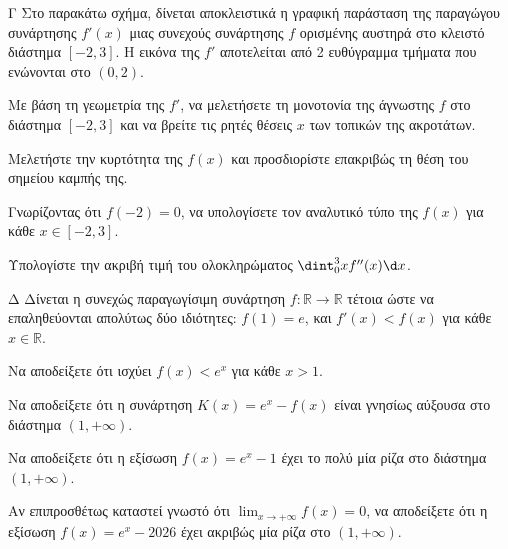 \begin{thema}{Γ}
Στο παρακάτω σχήμα, δίνεται αποκλειστικά η γραφική παράσταση της παραγώγου συνάρτησης $f'(x)$ μιας συνεχούς συνάρτησης $f$ ορισμένης αυστηρά στο κλειστό διάστημα $[-2, 3]$. Η εικόνα της $f'$ αποτελείται από 2 ευθύγραμμα τμήματα που ενώνονται στο $(0,2)$.

\begin{center}
\end{center}

\begin{erwthma}
    \item Με βάση τη γεωμετρία της $f'$, να μελετήσετε τη μονοτονία της άγνωστης $f$ στο διάστημα $[-2, 3]$ και να βρείτε τις ρητές θέσεις $x$ των τοπικών της ακροτάτων. 
    \item Μελετήστε την κυρτότητα της $f(x)$ και προσδιορίστε επακριβώς τη θέση του σημείου καμπής της. 
    \item Γνωρίζοντας ότι $f(-2) = 0$, να υπολογίσετε τον αναλυτικό τύπο της $f(x)$ για κάθε $x \in [-2, 3]$. 
    \item Υπολογίστε την ακριβή τιμή του ολοκληρώματος $\dint_0^3 x f''(x) \d x$. 
\end{erwthma}
\end{thema}

\begin{thema}{Δ}
Δίνεται η συνεχώς παραγωγίσιμη συνάρτηση $f: \mathbb{R} \to \mathbb{R}$ τέτοια ώστε να επαληθεύονται απολύτως δύο ιδιότητες: $f(1)=e$, και $f'(x) < f(x)$ για κάθε $x \in \mathbb{R}$.
\begin{erwthma}
    \item Να αποδείξετε ότι ισχύει $f(x) < e^x$ για κάθε $x > 1$. 
    \item Να αποδείξετε ότι η συνάρτηση $K(x) = e^x - f(x)$ είναι γνησίως αύξουσα στο διάστημα $(1, +\infty)$. 
    \item Να αποδείξετε ότι η εξίσωση $f(x) = e^x - 1$ έχει το πολύ μία ρίζα στο διάστημα $(1, +\infty)$. 
    \item Αν επιπροσθέτως καταστεί γνωστό ότι $\displaystyle\lim_{x\to+\infty} f(x) = 0$, να αποδείξετε ότι η εξίσωση $f(x) = e^x - 2026$ έχει ακριβώς μία ρίζα στο $(1, +\infty)$. 
\end{erwthma}
\end{thema}

